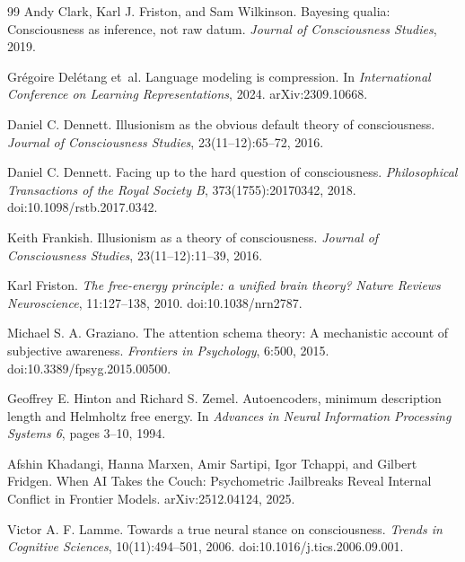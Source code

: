 \documentclass[11pt,a4paper]{article}
\theoremstyle{remark}\newtheorem{remark}[definition]{Remark}
\begin{document}
\begin{thebibliography}{99}
Andy Clark, Karl J. Friston, and Sam Wilkinson.
\newblock Bayesing qualia: Consciousness as inference, not raw datum.
\newblock \emph{Journal of Consciousness Studies}, 2019.

Gr\'egoire Del\'etang et~al.
\newblock Language modeling is compression.
\newblock In \emph{International Conference on Learning Representations}, 2024.
\newblock arXiv:2309.10668.

Daniel C. Dennett.
\newblock Illusionism as the obvious default theory of consciousness.
\newblock \emph{Journal of Consciousness Studies}, 23(11--12):65--72, 2016.

Daniel C. Dennett.
\newblock Facing up to the hard question of consciousness.
\newblock \emph{Philosophical Transactions of the Royal Society B}, 373(1755):20170342, 2018.
\newblock doi:10.1098/rstb.2017.0342.

Keith Frankish.
\newblock Illusionism as a theory of consciousness.
\newblock \emph{Journal of Consciousness Studies}, 23(11--12):11--39, 2016.

Karl Friston. \emph{The free-energy principle: a unified brain theory?} \emph{Nature Reviews Neuroscience}, 11:127--138, 2010.
\newblock doi:10.1038/nrn2787.

Michael S. A. Graziano.
\newblock The attention schema theory: A mechanistic account of subjective awareness.
\newblock \emph{Frontiers in Psychology}, 6:500, 2015.
\newblock doi:10.3389/fpsyg.2015.00500.

Geoffrey E. Hinton and Richard S. Zemel.
\newblock Autoencoders, minimum description length and Helmholtz free energy.
\newblock In \emph{Advances in Neural Information Processing Systems 6}, pages 3--10, 1994.

Afshin Khadangi, Hanna Marxen, Amir Sartipi, Igor Tchappi, and Gilbert Fridgen.
\newblock When AI Takes the Couch: Psychometric Jailbreaks Reveal Internal Conflict in Frontier Models.
\newblock arXiv:2512.04124, 2025.

Victor A. F. Lamme.
\newblock Towards a true neural stance on consciousness.
\newblock \emph{Trends in Cognitive Sciences}, 10(11):494--501, 2006.
\newblock doi:10.1016/j.tics.2006.09.001.


\end{thebibliography}
\end{document}
